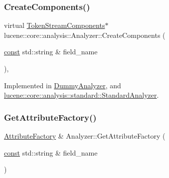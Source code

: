 \mbox{\label{classlucene_1_1core_1_1analysis_1_1Analyzer_a9b7dc3c598057fbf4e9b5f48066cb54a}} 
\subsubsection{\texorpdfstring{Create\+Components()}{CreateComponents()}}
{\footnotesize\ttfamily virtual \mbox{\hyperlink{classlucene_1_1core_1_1analysis_1_1TokenStreamComponents}{Token\+Stream\+Components}}$\ast$ lucene\+::core\+::analysis\+::\+Analyzer\+::\+Create\+Components (\begin{DoxyParamCaption}\item[{\mbox{\hyperlink{ZlibCrc32_8h_a2c212835823e3c54a8ab6d95c652660e}{const}} std\+::string \&}]{field\+\_\+name }\end{DoxyParamCaption})\hspace{0.3cm}{\ttfamily [protected]}, {}}



Implemented in \mbox{\hyperlink{classDummyAnalyzer_aeeb24aa6449d4bf7c4adc6a5c63a5c0e}{Dummy\+Analyzer}}, and \mbox{\hyperlink{classlucene_1_1core_1_1analysis_1_1standard_1_1StandardAnalyzer_a0d569e3e48f2060a4698481ec1b49d12}{lucene\+::core\+::analysis\+::standard\+::\+Standard\+Analyzer}}.

\mbox{\label{classlucene_1_1core_1_1analysis_1_1Analyzer_af0c3e02aef0e7a391b0abdbca218951b}} 
\subsubsection{\texorpdfstring{Get\+Attribute\+Factory()}{GetAttributeFactory()}}
{\footnotesize\ttfamily \mbox{\hyperlink{classlucene_1_1core_1_1util_1_1AttributeFactory}{Attribute\+Factory}} \& Analyzer\+::\+Get\+Attribute\+Factory (\begin{DoxyParamCaption}\item[{\mbox{\hyperlink{ZlibCrc32_8h_a2c212835823e3c54a8ab6d95c652660e}{const}} std\+::string \&}]{field\+\_\+name }\end{DoxyParamCaption})\hspace{0.3cm}{\ttfamily [protected]}}

